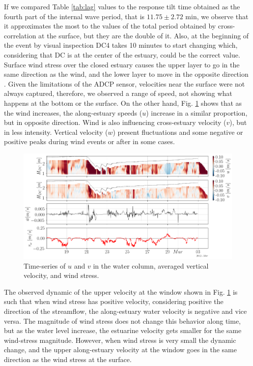 \documentclass[tesis.tex]{subfiles}
\begin{document}
    If we compared Table \ref{tab:lag} values to the response tilt time obtained as the fourth part of the internal wave period, that is $11.75 \pm 2.72$ min, we observe that it approximates the most to the values of the total period obtained by cross-correlation at the surface, but they are the double of it. Also, at the beginning of the event by visual inspection DC4 takes 10 minutes to start changing which, considering that DC is at the center of the estuary, could be the correct value.\\

    Surface wind stress over the closed estuary causes the upper layer to go in the same direction as the wind, and the lower layer to move in the opposite direction \citep{Katopodes2018}. Given the limitations of the ADCP sensor, velocities near the surface were not always captured, therefore, we observed a range of speed, not showing what happens at the bottom or the surface. On the other hand, Fig. \ref{fig:vels} shows that as the wind increases, the along-estuary speeds ($u$) increase in a similar proportion, but in opposite direction. Wind is also influencing cross-estuary velocity ($v$), but in less intensity. Vertical velocity ($w$) present fluctuations and some negative or positive peaks during wind events or after in some cases. \\

    \begin{figure}[h!]
        \centering
        \includegraphics[width=\textwidth]{Imagenes/vels.png}
        \caption{Time-series of $u$ and $v$ in the water column, averaged vertical velocity, and wind stress.}
        \label{fig:vels}
    \end{figure}
    
    The observed dynamic of the upper velocity at the window shown in Fig. \ref{fig:vels} is such that when wind stress has positive velocity, considering positive the direction of the streamflow, the along-estuary water velocity is negative and vice versa. The magnitude of wind stress does not change this behavior along time, but as the water level increase, the estuarine velocity gets smaller for the same wind-stress magnitude. However, when wind stress is very small the dynamic change, and the upper along-estuary velocity at the window goes in the same direction as the wind stress at the surface. \\
    
\end{document}

